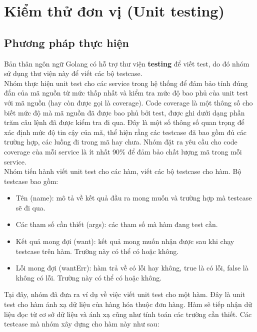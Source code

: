 
\section{Kiểm thử đơn vị (Unit testing)}
\subsection{Phương pháp thực hiện}

Bản thân ngôn ngữ Golang có hỗ trợ thư viện \textbf{testing} để viết test, do đó nhóm sử dụng thư viện này để viết các bộ testcase.\\

Nhóm thực hiện unit test cho các service trong hệ thống để đảm bảo tính đúng đắn của mã nguồn từ mức thấp nhất và kiểm tra mức độ bao phủ của unit test với mã nguồn (hay còn được gọi là coverage). Code coverage là một thông số cho biết mức độ mà mã nguồn đã được bao phủ bởi test, được ghi dưới dạng phần trăm câu lệnh đã được kiểm tra đi qua. Đây là một số thông số quan trọng để xác định mức độ tin cậy của mã, thể hiện rằng các testcase đã bao gồm đủ các trường hợp, các luồng đi trong mã hay chưa. Nhóm đặt ra yêu cầu cho code coverage của mỗi service là ít nhất 90\% để đảm bảo chất lượng mã trong mỗi service.\\



Nhóm tiến hành viết unit test cho các hàm, viết các bộ testcase cho hàm. Bộ testcase bao gồm:
\begin{itemize}
    \item Tên (name): mô tả về kết quả đầu ra mong muốn và trường hợp mà testcase sẽ đi qua.
    \item Các tham số cần thiết (args): các tham số mà hàm đang test cần.
    \item Kết quả mong đợi (want): kết quả mong muốn nhận được sau khi chạy testcase trên hàm. Trường này có thể có hoặc không.
    \item Lỗi mong đợi (wantErr): hàm trả về có lỗi hay không, true là có lỗi, false là không có lỗi. Trường này có thể có hoặc không.
\end{itemize}



Tại đây, nhóm đã đưa ra ví dụ về việc viết unit test cho một hàm. Đây là unit test cho hàm ánh xạ dữ liệu của hàng hóa thuộc đơn hàng. Hàm sẽ tiếp nhận dữ liệu đọc từ cơ sở dữ liệu và ánh xạ cũng như tính toán các trường cần thiết. Các testcase mà nhóm xây dựng cho hàm này như sau:\\



